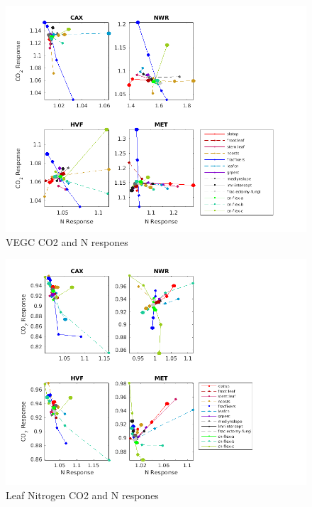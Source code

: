 \documentclass[draft,linenumbers]{agujournal}
\begin{document}
   \begin{figure}[h]
     \centering
     \includegraphics[width=1.55\textwidth, left]{matlab/figures/NOVc_CNdep_TOTVEGC1__p2012.png}
     \caption{VEGC CO2 and N respones}
     \label{VEGC CO2 and N respones 2001}
  \end{figure}
  
   \begin{figure}[h]
     \centering
     \includegraphics[width=1.55\textwidth, left]{matlab/figures/NOVc_CNdep_LEAFN1__p2012.png}
     \caption{Leaf Nitrogen CO2 and N respones}
     \label{Leaf N CO2 and N respones 2001}
  \end{figure}
    
 
    

  
  
\end{document}
